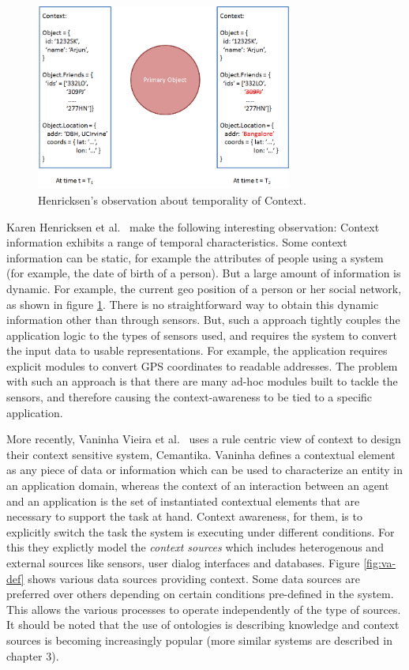 \begin{figure}[t]
\centering
\includegraphics[width=0.75\textwidth]{media/chapter2/ka-obs.png}
\caption{Henricksen's observation about temporality of Context.}
\label{fig:karen-obs}
\end{figure}

Karen Henricksen et al.\ \cite{henricksen2002modeling} make the following interesting observation: Context information exhibits a range of temporal characteristics. Some context information can be static, for example the attributes of people using a system (for example, the date of birth of a person). But a large amount of information is dynamic. For example, the current geo position of a person or her social network, as shown in figure \ref{fig:karen-obs}. There is no straightforward way to obtain this dynamic information other than through sensors. But, such a approach tightly couples the application logic to the types of sensors used, and requires the system to convert the input data to usable representations. For example, the application requires explicit modules to convert GPS coordinates to readable addresses. The problem with such an approach is that there are many ad-hoc modules built to tackle the sensors, and therefore causing the context-awareness to be tied to a specific application.

More recently, Vaninha Vieira et al.\ \cite{vieira2011designing} uses a rule centric view of context to design their context sensitive system, Cemantika. Vaninha defines a contextual element as any piece of data or information which can be used to characterize an entity in an application domain, whereas the context of an interaction between an agent and an application is the set of instantiated contextual elements that are necessary to support the task at hand. Context awareness, for them, is to explicitly switch the task the system is executing under different conditions. For this they explictly model the \textit{context sources} which includes heterogenous and  external sources like sensors, user dialog interfaces and databases. Figure \ref{fig:va-def} shows various data sources providing context. Some data sources are preferred over others depending on certain conditions pre-defined in the system. This allows the various processes to operate independently of the type of sources. It should be noted that the use of ontologies is describing knowledge and context sources is becoming increasingly popular (more similar systems are described in chapter 3).

